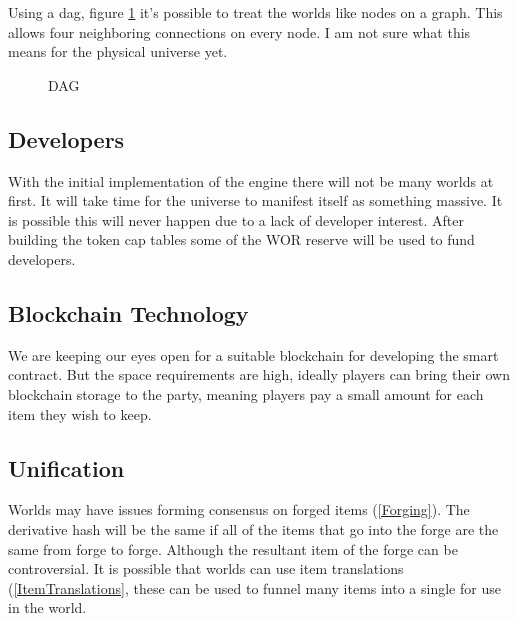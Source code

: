 \documentclass[runningheads,a4paper]{llncs}
\begin{document}
Using a dag, figure \ref{Graph} it's possible to treat the worlds like nodes on a graph. This allows four neighboring connections on every node. I am not sure what this means for the physical universe yet.

\begin{figure}
\centering
\caption{DAG}
\label{Graph}
\end{figure}

\subsection{Developers}
With the initial implementation of the engine there will not be many worlds at first. It will take time for the universe to manifest itself as something massive. It is possible this will never happen due to a lack of developer interest. After building the token cap tables some of the WOR reserve will be used to fund developers.

\subsection{Blockchain Technology}
We are keeping our eyes open for a suitable blockchain for developing the smart contract. But the space requirements are high, ideally players can bring their own blockchain storage to the party, meaning players pay a small amount for each item they wish to keep. 

\subsection{Unification}
Worlds may have issues forming consensus on forged items (\ref{Forging}). The derivative hash will be the same if all of the items that go into the forge are the same from forge to forge. Although the resultant item of the forge can be controversial. It is possible that worlds can use item translations (\ref{ItemTranslations}, these can be used to funnel many items into a single for use in the world.
\end{document}
